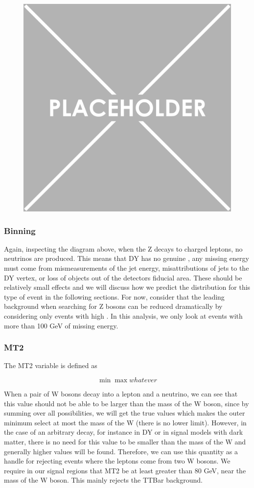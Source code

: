       \begin{figure}[h!]
        \centering
        \includegraphics[width=.5\textwidth]{figures/placeholder.png}
        \caption{}
        \label{fig:DY-diagram}
      \end{figure}

    \subsubsection{\MET Binning}
      Again, inspecting the diagram above, when the Z decays to charged leptons, no neutrinos are produced. This means that DY has no genuine \MET, any missing energy must come from mismeasurements of the jet energy, misattributions of jets to the DY vertex, or loss of objects out of the detectors fiducial area. These should be relatively small effects and we will discuss how we predict the \MET distribution for this type of event in the following sections. For now, consider that the leading background when searching for Z bosons can be reduced dramatically by considering only events with high \MET. In this analysis, we only look at events with more than 100 GeV of missing energy.

    \subsubsection{MT2}
      The MT2 variable is defined as

      \[
      \min\max{whatever}
      \]

      When a pair of W bosons decay into a lepton and a neutrino, we can see that this value should not be able to be larger than the mass of the W boson, since by summing over all possibilities, we will get the true values which makes the outer minimum select at most the mass of the W (there is no lower limit). However, in the case of an arbitrary decay, for instance in DY or in signal models with dark matter, there is no need for this value to be smaller than the mass of the W and generally higher values will be found. Therefore, we can use this quantity as a handle for rejecting events where the leptons come from two W bosons. We require in our signal regions that MT2 be at least greater than 80 GeV, near the mass of the W boson. This mainly rejects the TTBar background. 

